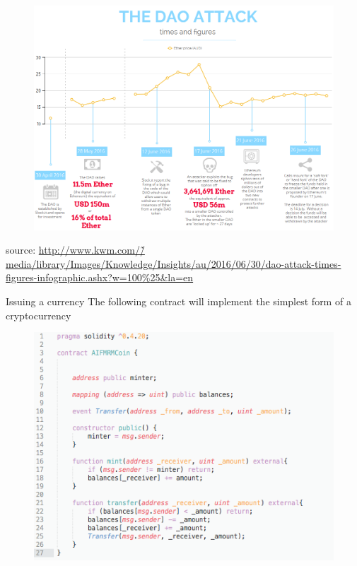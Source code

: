 \documentclass[10pt]{beamer}
\begin{document}
\begin{frame}{}
	\begin{figure}[]
		\centering
		\includegraphics  [scale=0.3]{Images/dao-attack}
	\end{figure}
	\begin{scriptsize}
		source: \href{http://www.kwm.com/en/knowledge/insights/smart-contracts-open-source-model-dna-digital-analogue-human-20160630}{http://www.kwm.com/\~/media/library/Images/Knowledge/Insights/au/2016/06/30/dao-attack-times-figures-infographic.ashx?w=100\%25\&la=en}
	\end{scriptsize}
\end{frame}


\begin{frame}{Issuing a currency}
	The following contract will implement the simplest form of a cryptocurrency
	\begin{figure}[]
		\centering
		\includegraphics  [scale=0.4]{Images/contract_new}
	\end{figure}
\end{frame}
\end{document}
